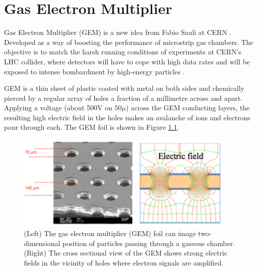 \chapter{Gas Electron Multiplier} %
\label{cha:gas_electron_multiplier}

Gas Electron Multiplier (GEM) is a new idea from Fabio Sauli at CERN \cite{Sauli1997}. Developed as a way of boosting the performance of microstrip gas chambers. The objective is to match the harsh running conditions of experiments at CERN's LHC collider, where detectors will have to cope with high data rates and will be exposed to intense bombardment by high-energy particles \cite{detector:1732870}.

GEM is a thin sheet of plastic coated with metal on both sides and chemically pierced by a regular array of holes a fraction of a millimetre across and apart. Applying a voltage (about 500V on 50$\mu$) across the GEM conducting layers, the resulting high electric field in the holes makes an avalanche of ions and electrons pour through each. The GEM foil is shown in Figure \ref{fig:gem}.

\begin{figure}[!htbp]
	\centering
	\includegraphics[width=0.95\textwidth]{figures/GEM/KEKDTP3.jpg}
	\caption{(Left) The gas electron multiplier (GEM) foil can image two-dimensional position of particles passing through a gaseous chamber. (Right) The cross sectional view of the GEM shows strong electric fields in the vicinity of holes where electron signals are amplified.}
	\label{fig:gem}
\end{figure}

